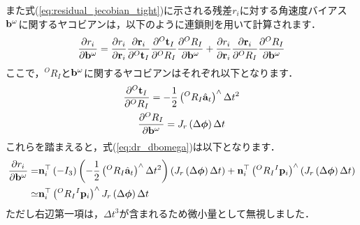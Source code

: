また式(\ref{eq:residual_jecobian_tight})に示される残差$r_{i}$に対する角速度バイアス${\bf b}^{\omega}$に関するヤコビアンは，以下のように連鎖則を用いて計算されます．
%
\begin{align}
  \frac{ \partial r_{i} }{ \partial {\bf b}^{\omega} }
  =
  \frac{ \partial r_{i} }{ \partial {\bf r}_{i} }
  \frac{ \partial {\bf r}_{i} }{ \partial {}^{O}{\bf t}_{I} }
  \frac{ \partial {}^{O}{\bf t}_{I} }{ \partial {}^{O}R_{I} }
  \frac{ \partial {}^{O}R_{I} }{ \partial {\bf b}^{\omega} }
  +
  \frac{ \partial r_{i} }{ \partial {\bf r}_{i} }
  \frac{ \partial {\bf r}_{i} }{ \partial {}^{O}R_{I} }
  \frac{ \partial {}^{O}R_{I} }{ \partial {\bf b}^{\omega} }
  \label{eq:dr_dbomega}
\end{align}
%
ここで，${}^{O}R_{I}$と${\bf b}^{\omega}$に関するヤコビアンはそれぞれ以下となります．
%
\begin{align}
  \begin{gathered}
    \frac{ \partial {}^{O}{\bf t}_{I} }{ \partial {}^{O}R_{I} }
    =
    -\frac{1}{2} \left( {}^{O}R_{I} \hat{ {\bf a} }_{t} \right)^{\wedge} \Delta t^{2} \\
%
    \frac{ \partial {}^{O}R_{I} }{ \partial {\bf b}^{\omega} }
    =
    J_{r} \left( \Delta \boldsymbol \phi \right) \Delta t
  \end{gathered}
\end{align}
%
これらを踏まえると，式(\ref{eq:dr_dbomega})は以下となります．
%
\begin{align}
  \begin{split}
    \frac{ \partial r_{i} }{ \partial {\bf b}^{\omega} }
    = &
    {\bf n}_{i}^{\top}
    \left( -I_{3} \right)
    \left( -\frac{1}{2} \left( {}^{O}R_{I} \hat{ {\bf a} }_{t} \right)^{\wedge} \Delta t^{2} \right)
    \left( J_{r} \left( \Delta \boldsymbol \phi \right) \Delta t \right)
    +
    {\bf n}_{i}^{\top}
    \left( {}^{O}R_{I} {}^{I}{\bf p}_{i} \right)^{\wedge}
    \left( J_{r} \left( \Delta \boldsymbol \phi \right) \Delta t \right) \\
    \simeq &
    {\bf n}_{i}^{\top}
    \left( {}^{O}R_{I} {}^{I}{\bf p}_{i} \right)^{\wedge}
    J_{r} \left( \Delta \boldsymbol \phi \right) \Delta t
  \end{split}
\end{align}
%
ただし右辺第一項は，$\Delta t^{3}$が含まれるため微小量として無視しました．
















